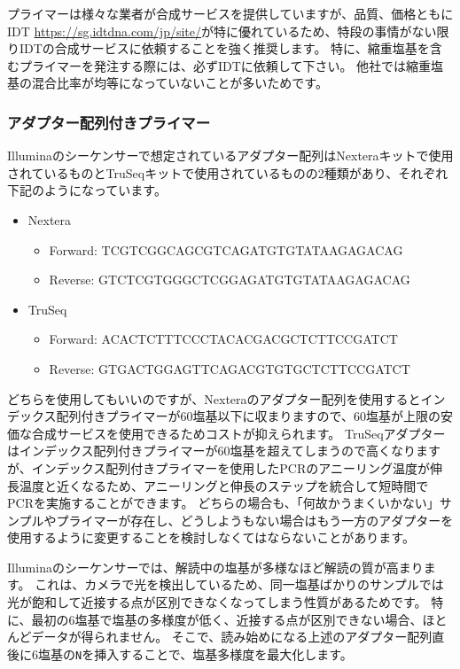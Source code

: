 \documentclass[titlepage,10pt,a4paper,uplatex]{jsbook}
\begin{document}
プライマーは様々な業者が合成サービスを提供していますが、品質、価格ともにIDT \url{https://sg.idtdna.com/jp/site/}が特に優れているため、特段の事情がない限りIDTの合成サービスに依頼することを強く推奨します。
特に、縮重塩基を含むプライマーを発注する際には、必ずIDTに依頼して下さい。
他社では縮重塩基の混合比率が均等になっていないことが多いためです。

\subsubsection{アダプター配列付きプライマー}

Illuminaのシーケンサーで想定されているアダプター配列はNexteraキットで使用されているものとTruSeqキットで使用されているものの2種類があり、それぞれ下記のようになっています。

\begin{itemize}
\item Nextera
\begin{itemize}
\item Forward: TCGTCGGCAGCGTCAGATGTGTATAAGAGACAG
\item Reverse: GTCTCGTGGGCTCGGAGATGTGTATAAGAGACAG
\end{itemize}
\item TruSeq
\begin{itemize}
\item Forward: ACACTCTTTCCCTACACGACGCTCTTCCGATCT
\item Reverse: GTGACTGGAGTTCAGACGTGTGCTCTTCCGATCT
\end{itemize}
\end{itemize}

どちらを使用してもいいのですが、Nexteraのアダプター配列を使用するとインデックス配列付きプライマーが60塩基以下に収まりますので、60塩基が上限の安価な合成サービスを使用できるためコストが抑えられます。
TruSeqアダプターはインデックス配列付きプライマーが60塩基を超えてしまうので高くなりますが、インデックス配列付きプライマーを使用したPCRのアニーリング温度が伸長温度と近くなるため、アニーリングと伸長のステップを統合して短時間でPCRを実施することができます。
どちらの場合も、「何故かうまくいかない」サンプルやプライマーが存在し、どうしようもない場合はもう一方のアダプターを使用するように変更することを検討しなくてはならないことがあります。

Illuminaのシーケンサーでは、解読中の塩基が多様なほど解読の質が高まります。
これは、カメラで光を検出しているため、同一塩基ばかりのサンプルでは光が飽和して近接する点が区別できなくなってしまう性質があるためです。
特に、最初の6塩基で塩基の多様度が低く、近接する点が区別できない場合、ほとんどデータが得られません。
そこで、読み始めになる上述のアダプター配列直後に6塩基の\texttt{N}を挿入することで、塩基多様度を最大化します。
\end{document}
